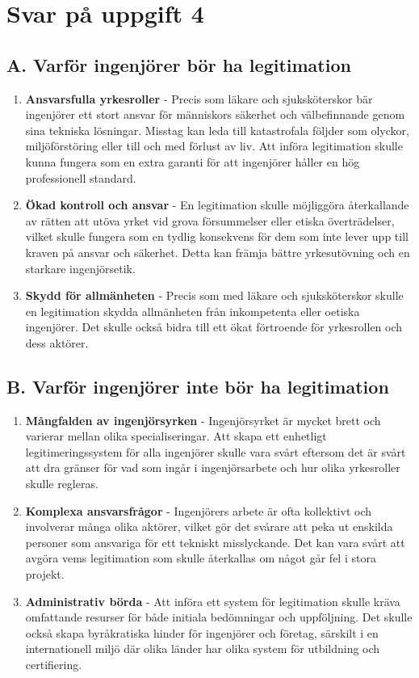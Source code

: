 \documentclass[a4paper,12pt]{article}
\begin{document}
\section*{Svar på uppgift 4}
\subsection*{A. Varför ingenjörer bör ha legitimation}
\begin{enumerate}
    \item \textbf{Ansvarsfulla yrkesroller} - Precis som läkare och
    sjuksköterskor bär ingenjörer ett stort ansvar för människors säkerhet och
    välbefinnande genom sina tekniska lösningar. Misstag kan leda till
    katastrofala följder som olyckor, miljöförstöring eller till och med
    förlust av liv. Att införa legitimation skulle kunna fungera som en extra
    garanti för att ingenjörer håller en hög professionell standard.
    \item \textbf{Ökad kontroll och ansvar} - En legitimation skulle möjliggöra
    återkallande av rätten att utöva yrket vid grova försummelser eller etiska
    överträdelser, vilket skulle fungera som en tydlig konsekvens för dem som
    inte lever upp till kraven på ansvar och säkerhet. Detta kan främja bättre
    yrkesutövning och en starkare ingenjörsetik.
    \item \textbf{Skydd för allmänheten} - Precis som med läkare och
    sjuksköterskor skulle en legitimation skydda allmänheten från inkompetenta
    eller oetiska ingenjörer. Det skulle också bidra till ett ökat förtroende
    för yrkesrollen och dess aktörer.
\end{enumerate}
%
\subsection*{B. Varför ingenjörer inte bör ha legitimation}
\begin{enumerate}
    \item \textbf{Mångfalden av ingenjörsyrken} - Ingenjörsyrket är mycket
    brett och varierar mellan olika specialiseringar. Att skapa ett enhetligt
    legitimeringssystem för alla ingenjörer skulle vara svårt eftersom det är
    svårt att dra gränser för vad som ingår i ingenjörsarbete och hur olika
    yrkesroller skulle regleras.
    \item \textbf{Komplexa ansvarsfrågor} - Ingenjörers arbete är ofta
    kollektivt och involverar många olika aktörer, vilket gör det svårare att
    peka ut enskilda personer som ansvariga för ett tekniskt misslyckande. Det
    kan vara svårt att avgöra vems legitimation som skulle återkallas om något
    går fel i stora projekt.
    \item \textbf{Administrativ börda} - Att införa ett system för legitimation
    skulle kräva omfattande resurser för både initiala bedömningar och
    uppföljning. Det skulle också skapa byråkratiska hinder för ingenjörer och
    företag, särskilt i en internationell miljö där olika länder har olika
    system för utbildning och certifiering.
\end{enumerate}
%
\end{document}
